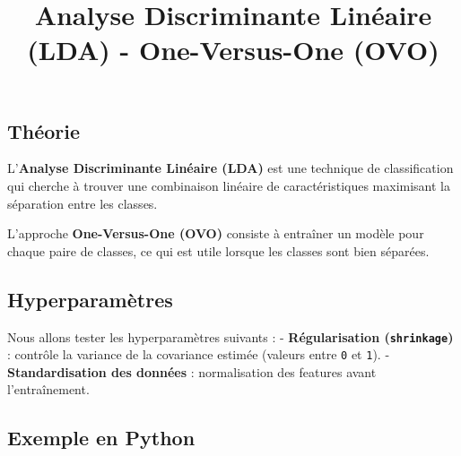 \documentclass[
  letterpaper,
  DIV=11,
  numbers=noendperiod]{scrartcl}
\title{Analyse Discriminante Linéaire (LDA) - One-Versus-One (OVO)}
\author{}
\date{}
\begin{document}
\maketitle


\subsection{Théorie}\label{thuxe9orie}

L'\textbf{Analyse Discriminante Linéaire (LDA)} est une technique de
classification qui cherche à trouver une combinaison linéaire de
caractéristiques maximisant la séparation entre les classes.

L'approche \textbf{One-Versus-One (OVO)} consiste à entraîner un modèle
pour chaque paire de classes, ce qui est utile lorsque les classes sont
bien séparées.

\subsection{Hyperparamètres}\label{hyperparamuxe8tres}

Nous allons tester les hyperparamètres suivants : -
\textbf{Régularisation (\texttt{shrinkage})} : contrôle la variance de
la covariance estimée (valeurs entre \texttt{0} et \texttt{1}). -
\textbf{Standardisation des données} : normalisation des features avant
l'entraînement.

\subsection{Exemple en Python}\label{exemple-en-python}
\end{document}
